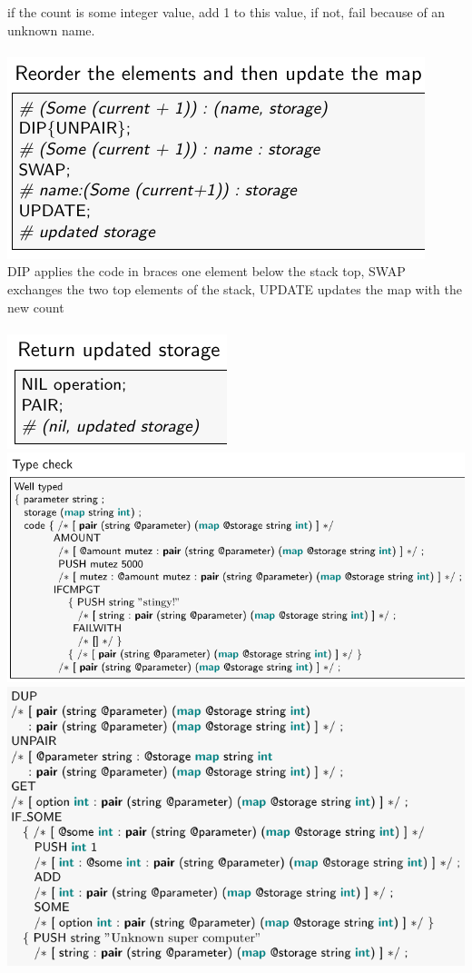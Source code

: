 \documentclass{article}
\begin{document}
if the count is some integer value, add 1 to this value, if not, fail because of an unknown name.\\\\
\includegraphics[scale=0.4]{66.png}\\
DIP applies the code in braces one element below the stack top, SWAP exchanges the two top elements of the stack, UPDATE updates the map with the new count\\\\
\includegraphics[scale=0.4]{67.png}
\includegraphics[scale=0.4]{68.png}\\
\includegraphics[scale=0.4]{69.png}
\end{document}
